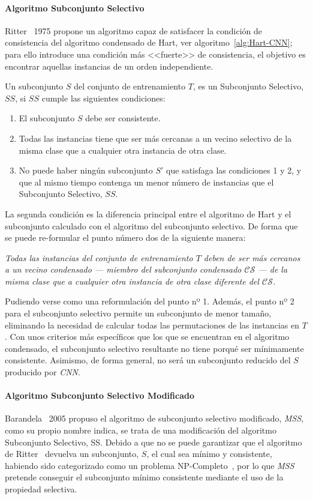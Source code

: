 \paragraph{Algoritmo Subconjunto Selectivo}\label{paragraph:SS}
\hfill \break
Ritter~\cite{ritter1975algorithm} 1975 propone un algoritmo capaz de satisfacer la condición de consistencia del algoritmo condensado de Hart, ver algoritmo~\ref{alg:Hart-CNN}; para ello introduce una condición más <<fuerte>> de consistencia, el objetivo es encontrar aquellas instancias de un orden independiente. 

Un subconjunto $S$ del conjunto de entrenamiento $T$, es un Subconjunto Selectivo, $SS$, si $SS$ cumple las siguientes condiciones:
\begin{enumerate}
\item El subconjunto $S$ debe ser consistente.
\item Todas las instancias tiene que ser más cercanas a un vecino selectivo de la misma clase que a cualquier otra instancia de otra clase.
\item No puede haber ningún subconjunto $S'$ que satisfaga las condiciones 1 y 2, y que al mismo tiempo contenga un menor número de instancias que el Subconjunto Selectivo, $SS$.
\end{enumerate}

La segunda condición es la diferencia principal entre el algoritmo de Hart y el subconjunto calculado con el algoritmo del subconjunto selectivo. De forma que se puede re-formular el punto número dos de la siguiente manera:

\emph{Todas las instancias del conjunto de entrenamiento $T$ deben de ser más cercanos a un vecino condensado --- miembro del subconjunto condensado $\mathcal{CS}$ --- de la misma clase que a cualquier otra instancia de otra clase diferente del $\mathcal{CS}$.}

Pudiendo verse como una reformulación del punto nº 1. Además, el punto nº  2 para el subconjunto selectivo permite un subconjunto de menor tamaño, eliminando la necesidad de calcular todas las permutaciones de las instancias en $T$. Con unos criterios más específicos que los que se encuentran en el algoritmo condensado, el subconjunto selectivo resultante no tiene porqué ser mínimamente consistente. Asimismo, de forma general, no será un subconjunto reducido del $S$ producido por \textit{CNN}.


\paragraph{Algoritmo Subconjunto Selectivo Modificado}\label{paragraph:MSS}
\hfill \break
Barandela~\cite{barandela2005decision} 2005 propuso el algoritmo de subconjunto selectivo modificado, \textit{MSS}, como su propio nombre indica, se trata de una modificación del algoritmo Subconjunto Selectivo, SS. Debido a que no se puede garantizar que el algoritmo de Ritter~\cite{ritter1975algorithm} devuelva un subconjunto, $S$, el cual sea mínimo y consistente, habiendo sido categorizado como un problema NP-Completo~\cite{wilfong1992nearest}, por lo que \textit{MSS} pretende conseguir el subconjunto mínimo consistente mediante el uso de la propiedad selectiva.


